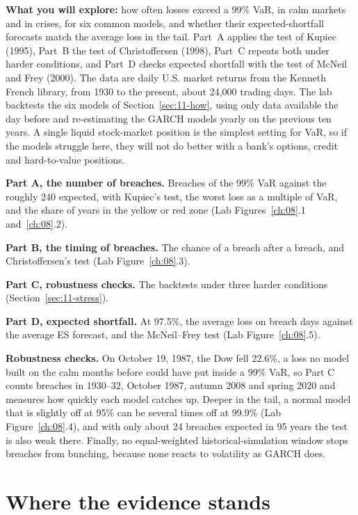 \textbf{What you will explore:} how often losses exceed a 99\% VaR, in calm markets and in crises, for six common models, and whether their expected-shortfall forecasts match the average loss in the tail. Part~A applies the test of Kupiec (1995), Part~B the test of Christoffersen (1998), Part~C repeats both under harder conditions, and Part~D checks expected shortfall with the test of McNeil and Frey (2000). The data are daily U.S. market returns from the Kenneth French library, from 1930 to the present, about 24,000 trading days. The lab backtests the six models of Section~\ref{sec:11-how}, using only data available the day before and re-estimating the GARCH models yearly on the previous ten years. A single liquid stock-market position is the simplest setting for VaR, so if the models struggle here, they will not do better with a bank's options, credit and hard-to-value positions.

\textbf{Part A, the number of breaches.} Breaches of the 99\% VaR against the roughly 240 expected, with Kupiec's test, the worst loss as a multiple of VaR, and the share of years in the yellow or red zone (Lab Figures~\ref{ch:08}.1 and~\ref{ch:08}.2).

\textbf{Part B, the timing of breaches.} The chance of a breach after a breach, and Christoffersen's test (Lab Figure~\ref{ch:08}.3).

\textbf{Part C, robustness checks.} The backtests under three harder conditions (Section~\ref{sec:11-stress}).

\textbf{Part D, expected shortfall.} At 97.5\%, the average loss on breach days against the average ES forecast, and the McNeil--Frey test (Lab Figure~\ref{ch:08}.5).

\label{sec:11-stress}
\textbf{Robustness checks.} On October 19, 1987, the Dow fell 22.6\%, a loss no model built on the calm months before could have put inside a 99\% VaR, so Part C counts breaches in 1930--32, October 1987, autumn 2008 and spring 2020 and measures how quickly each model catches up. Deeper in the tail, a normal model that is slightly off at 95\% can be several times off at 99.9\% (Lab Figure~\ref{ch:08}.4), and with only about 24 breaches expected in 95 years the test is also weak there. Finally, no equal-weighted historical-simulation window stops breaches from bunching, because none reacts to volatility as GARCH does.

\section{Where the evidence stands}
\label{sec:11-verdict}


